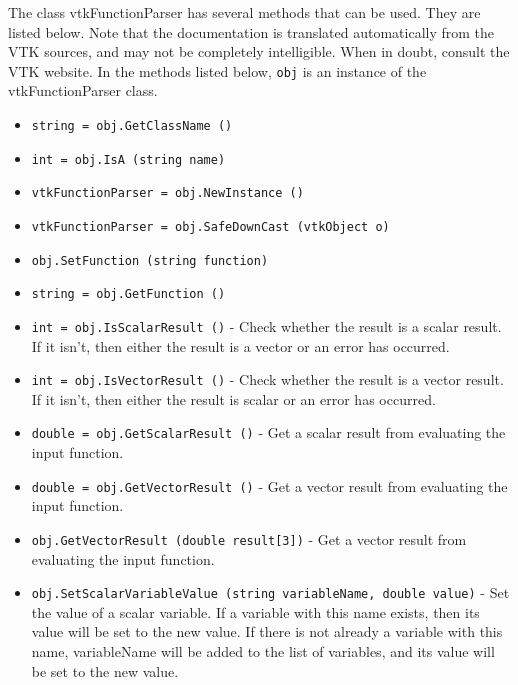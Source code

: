 The class vtkFunctionParser has several methods that can be used.
  They are listed below.
Note that the documentation is translated automatically from the VTK sources,
and may not be completely intelligible.  When in doubt, consult the VTK website.
In the methods listed below, \verb|obj| is an instance of the vtkFunctionParser class.
\begin{itemize}
\item  \verb|string = obj.GetClassName ()|

\item  \verb|int = obj.IsA (string name)|

\item  \verb|vtkFunctionParser = obj.NewInstance ()|

\item  \verb|vtkFunctionParser = obj.SafeDownCast (vtkObject o)|

\item  \verb|obj.SetFunction (string function)|

\item  \verb|string = obj.GetFunction ()|

\item  \verb|int = obj.IsScalarResult ()| -  Check whether the result is a scalar result.  If it isn't, then
 either the result is a vector or an error has occurred.

\item  \verb|int = obj.IsVectorResult ()| -  Check whether the result is a vector result.  If it isn't, then
 either the result is scalar or an error has occurred.

\item  \verb|double = obj.GetScalarResult ()| -  Get a scalar result from evaluating the input function.

\item  \verb|double = obj.GetVectorResult ()| -  Get a vector result from evaluating the input function.

\item  \verb|obj.GetVectorResult (double result[3])| -  Get a vector result from evaluating the input function.

\item  \verb|obj.SetScalarVariableValue (string variableName, double value)| -  Set the value of a scalar variable.  If a variable with this name
 exists, then its value will be set to the new value.  If there is not
 already a variable with this name, variableName will be added to the
 list of variables, and its value will be set to the new value.


\end{itemize}

